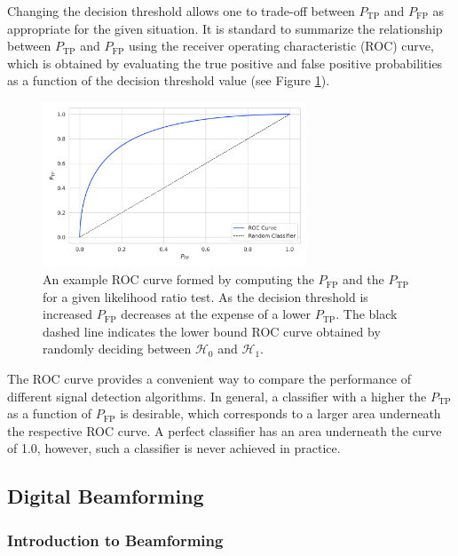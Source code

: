 Changing the decision threshold allows one to trade-off between $P_{\textrm{TP}}$ and $P_{\textrm{FP}}$ as appropriate for the given situation. It is standard to summarize the relationship between $P_{\textrm{TP}}$ and $P_{\textrm{FP}}$ using the receiver operating characteristic (ROC) curve, which is obtained by evaluating the true positive and false positive probabilities as a function of the decision threshold value (see Figure \ref{fig:chap4-example-roc-curve}).
\begin{figure}[htbp]
    \centering
    \includegraphics*[width=0.7\textwidth]{figs/Chapter-4/230603_roc_curve_example.png}
    \caption{\label{fig:chap4-example-roc-curve} An example ROC curve formed by computing the $P_\mathrm{FP}$ and the $P_\mathrm{TP}$ for a given likelihood ratio test. As the decision threshold is increased $P_\mathrm{FP}$ decreases at the expense of a lower $P_\mathrm{TP}$. The black dashed line indicates the lower bound ROC curve obtained by randomly deciding between $\mathcal{H}_0$ and $\mathcal{H}_1$. }
\end{figure}
The ROC curve provides a convenient way to compare the performance of different signal detection algorithms. In general, a classifier with a higher the $P_\mathrm{TP}$ as a function of $P_\mathrm{FP}$ is desirable, which corresponds to a larger area underneath the respective ROC curve. A perfect classifier has an area underneath the curve of 1.0, however, such a classifier is never achieved in practice. 

\subsection{Digital Beamforming}
\label{sec:chap4-dig-bf}

\subsubsection*{Introduction to Beamforming}

